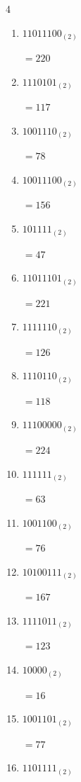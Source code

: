 \begin{multicols}{4}
\begin{enumerate}
        $=150$

  \item $11011100_{(2)}$

        $=220$

  \item $1110101_{(2)}$

        $=117$

  \item $1001110_{(2)}$

        $=78$

  \item $10011100_{(2)}$

        $=156$

  \item $101111_{(2)}$

        $=47$

  \item $11011101_{(2)}$

        $=221$

  \item $1111110_{(2)}$

        $=126$

  \item $1110110_{(2)}$

        $=118$

\columnbreak %

  \item $11100000_{(2)}$

        $=224$

  \item $111111_{(2)}$

        $=63$

  \item $1001100_{(2)}$

        $=76$

  \item $10100111_{(2)}$

        $=167$

  \item $1111011_{(2)}$

        $=123$

  \item $10000_{(2)}$

        $=16$

  \item $1001101_{(2)}$

        $=77$

  \item $1101111_{(2)}$


\end{enumerate}
\end{multicols}
